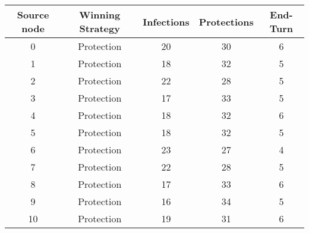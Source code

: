 \documentclass[results.tex]{subfiles}
\begin{document}
    \begin{center}
        \begin{tabular}{| c || c | c | c | c |}
            \hline
            {\bfseries Source node} & {\bfseries Winning Strategy} & {\bfseries Infections} & {\bfseries Protections}
            & {\bfseries End-Turn}
            \\  %
            \hline\hline
            0                       & Protection                   & 20                     & 30                      & 6                    \\
            \hline
            1                       & Protection                   & 18                     & 32                      & 5                    \\
            \hline
            2                       & Protection                   & 22                     & 28                      & 5                    \\
            \hline
            3                       & Protection                   & 17                     & 33                      & 5                    \\
            \hline
            4                       & Protection                   & 18                     & 32                      & 6                    \\
            \hline
            5                       & Protection                   & 18                     & 32                      & 5                    \\
            \hline
            6                       & Protection                   & 23                     & 27                      & 4                    \\
            \hline
            7                       & Protection                   & 22                     & 28                      & 5                    \\
            \hline
            8                       & Protection                   & 17                     & 33                      & 6                    \\
            \hline
            9                       & Protection                   & 16                     & 34                      & 5                    \\
            \hline
            10                      & Protection                   & 19                     & 31                      & 6                    \\

\end{tabular}
\end{center}
\end{document}
